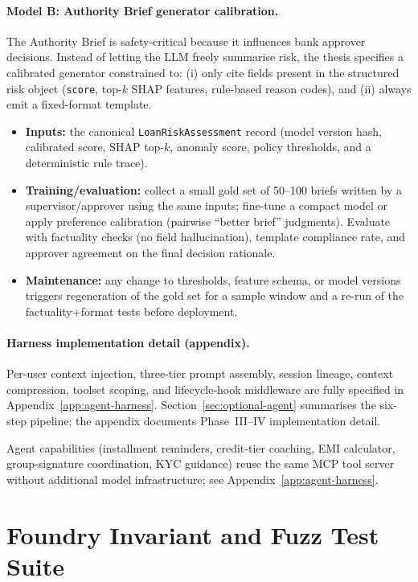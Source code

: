 \documentclass[12pt,a4paper]{report}
\begin{document}
\paragraph{Model B: Authority Brief generator calibration.}
The Authority Brief is safety-critical because it influences bank approver decisions. Instead of letting the LLM freely summarise risk, the thesis specifies a calibrated generator constrained to: (i) only cite fields present in the structured risk object (\texttt{score}, top-$k$ SHAP features, rule-based reason codes), and (ii) always emit a fixed-format template.
\begin{itemize}[noitemsep]
  \item \textbf{Inputs:} the canonical \texttt{LoanRiskAssessment} record (model version hash, calibrated score, SHAP top-$k$, anomaly score, policy thresholds, and a deterministic rule trace).
  \item \textbf{Training/evaluation:} collect a small gold set of 50--100 briefs written by a supervisor/approver using the same inputs; fine-tune a compact model or apply preference calibration (pairwise ``better brief'' judgments). Evaluate with factuality checks (no field hallucination), template compliance rate, and approver agreement on the final decision rationale.
  \item \textbf{Maintenance:} any change to thresholds, feature schema, or model versions triggers regeneration of the gold set for a sample window and a re-run of the factuality+format tests before deployment.
\end{itemize}

\paragraph{Harness implementation detail (appendix).}
Per-user context injection, three-tier prompt assembly, session lineage, context compression, toolset scoping, and lifecycle-hook middleware are fully specified in Appendix~\ref{app:agent-harness}. Section~\ref{sec:optional-agent} summarises the six-step pipeline; the appendix documents Phase~III--IV implementation detail.

\noindent Agent capabilities (installment reminders, credit-tier coaching, EMI calculator, group-signature coordination, KYC guidance) reuse the same MCP tool server without additional model infrastructure; see Appendix~\ref{app:agent-harness}.

\section{Foundry Invariant and Fuzz Test Suite}
\label{sec:foundry}
\end{document}
